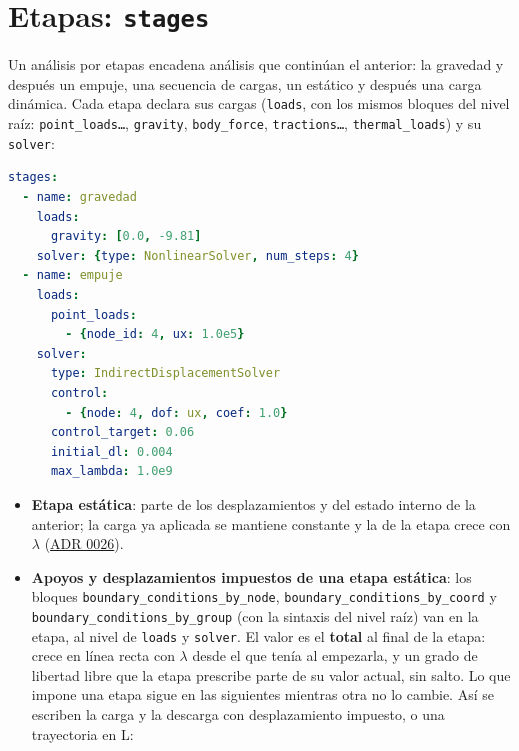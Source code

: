 \documentclass[11pt,oneside]{report}
\begin{document}
\section{Etapas: \texttt{stages}}

Un análisis por etapas encadena análisis que continúan el anterior: la gravedad y después un empuje, una secuencia de cargas, un estático y después una carga dinámica. Cada etapa declara sus cargas (\texttt{loads}, con los mismos bloques del nivel raíz: \texttt{point\_loads\ldots{}}, \texttt{gravity}, \texttt{body\_force}, \texttt{tractions\ldots{}}, \texttt{thermal\_loads}) y su \texttt{solver}:

\begin{lstlisting}[language=yaml]
stages:
  - name: gravedad
    loads:
      gravity: [0.0, -9.81]
    solver: {type: NonlinearSolver, num_steps: 4}
  - name: empuje
    loads:
      point_loads:
        - {node_id: 4, ux: 1.0e5}
    solver:
      type: IndirectDisplacementSolver
      control:
        - {node: 4, dof: ux, coef: 1.0}
      control_target: 0.06
      initial_dl: 0.004
      max_lambda: 1.0e9

\end{lstlisting}

\begin{itemize}
  \item \textbf{Etapa estática}: parte de los desplazamientos y del estado interno de la anterior; la carga ya aplicada se mantiene constante y la de la etapa crece con \ensuremath{\lambda} (\href{https://github.com/jretamav/solidum-fem/blob/main/docs/adr/0026-etapas-de-carga-en-los-solvers-estaticos.md}{ADR 0026}).
  \item \textbf{Apoyos y desplazamientos impuestos de una etapa estática}: los bloques \texttt{boundary\_\allowbreak{}conditions\_\allowbreak{}by\_\allowbreak{}node}, \texttt{boundary\_\allowbreak{}conditions\_\allowbreak{}by\_\allowbreak{}coord} y \texttt{boundary\_\allowbreak{}conditions\_\allowbreak{}by\_\allowbreak{}group} (con la sintaxis del nivel raíz) van en la etapa, al nivel de \texttt{loads} y \texttt{solver}. El valor es el \textbf{total} al final de la etapa: crece en línea recta con \ensuremath{\lambda} desde el que tenía al empezarla, y un grado de libertad libre que la etapa prescribe parte de su valor actual, sin salto. Lo que impone una etapa sigue en las siguientes mientras otra no lo cambie. Así se escriben la carga y la descarga con desplazamiento impuesto, o una trayectoria en L:
\end{itemize}
\end{document}

